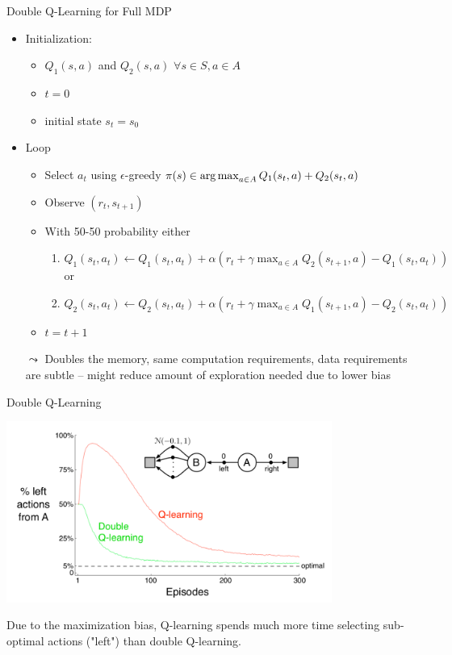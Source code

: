 \documentclass[aspectratio=169]{../latex_main/tntbeamer}  %
\begin{document}
\begin{frame}[c]{Double Q-Learning for Full MDP}	
	
	\begin{itemize}
		\item Initialization:
		\begin{itemize}
			\item $Q_1(s,a)$ and $Q_2(s,a)$ $\forall s \in S, a\in A$
			\item $t= 0$
			\item initial state $s_t = s_0$
		\end{itemize}
		\item Loop
		\begin{itemize}
			\item Select $a_t$ using $\epsilon$-greedy $\pi(s) \in \operatorname*{arg\,max}_{a \in A} Q_1(s_t, a) + Q_2(s_t , a)$
			\item Observe $(r_t, s_{t+1})$
			\item With 50-50 probability either
			\begin{enumerate}
				\item $Q_1(s_t, a_t) \gets Q_1(s_t, a_t) + \alpha (r_t +\gamma \max_{a\in A} Q_2(s_{t+1}, a) - Q_1(s_t, a_t))$\\
				or
				\item $Q_2(s_t, a_t) \gets Q_2(s_t, a_t) + \alpha (r_t +\gamma \max_{a\in A} Q_1(s_{t+1}, a) - Q_2(s_t, a_t))$
			\end{enumerate}
			\item $t = t + 1 $
		\end{itemize}
		\bigskip
		\pause
		\item[$\leadsto$] Doubles the memory, same computation requirements, data requirements are subtle -- might reduce amount of exploration needed due to lower bias
	\end{itemize}
	
	
\end{frame}
\begin{frame}[c]{Double Q-Learning }
	
\begin{center}
\includegraphics[width=0.8\textwidth]{images/double_q.png}
\end{center}

Due to the maximization bias, Q-learning spends much more time
selecting sub-optimal actions ("left") than double Q-learning.
	
	
\end{frame}
\end{document}
